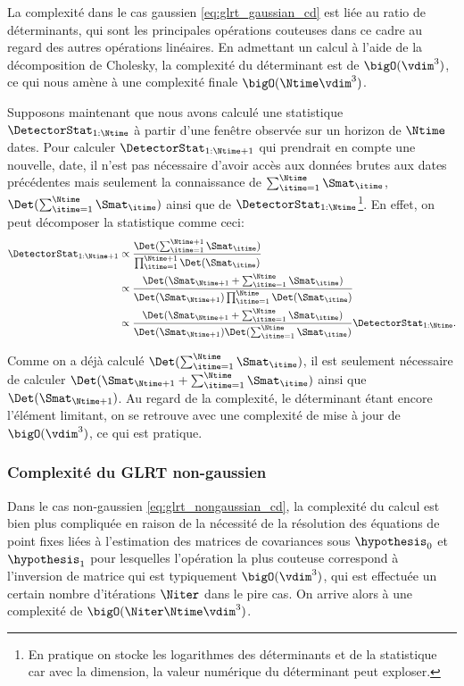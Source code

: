 La complexité dans le cas gaussien \eqref{eq:glrt_gaussian_cd} est liée au ratio de déterminants, qui sont les principales opérations couteuses dans ce cadre au regard des autres opérations linéaires. En admettant un calcul à l'aide de la décomposition de Cholesky, la complexité du déterminant est de $\bigO(\vdim^3)$, ce qui nous amène à une complexité finale $\bigO(\Ntime\vdim^3)$.

Supposons maintenant que nous avons calculé une statistique $\DetectorStat_{1:\Ntime}$ à partir d'une fenêtre observée sur un horizon de $\Ntime$ dates. Pour calculer $\DetectorStat_{1:\Ntime+1}$ qui prendrait en compte une nouvelle, date, il n'est pas nécessaire d'avoir accès aux données brutes aux dates précédentes mais seulement la connaissance de $\sum_{\itime=1}^{\Ntime}\Smat_\itime$, $\Det(\sum_{\itime=1}^{\Ntime}\Smat_\itime)$ ainsi que de $\DetectorStat_{1:\Ntime}$\footnote{En pratique on stocke les logarithmes des déterminants et de la statistique car avec la dimension, la valeur numérique du déterminant peut exploser.}. En effet, on peut décomposer la statistique comme ceci\cite{Conradsen_2016}:
$$
\begin{aligned}
  \DetectorStat_{1:\Ntime+1} &\propto \dfrac{\Det(\sum_{\itime=1}^{\Ntime+1} \Smat_\itime)}{\prod_{\itime=1}^{\Ntime+1} \Det(\Smat_\itime)} \\
  &\propto \dfrac{\Det(\Smat_{\Ntime+1} + \sum_{\itime=1}^{\Ntime} \Smat_\itime )}{ \Det(\Smat_{\Ntime+1}) \prod_{\itime=1}^{\Ntime} \Det(\Smat_\itime)} \\
  &\propto  \dfrac{\Det(\Smat_{\Ntime+1} + \sum_{\itime=1}^{\Ntime} \Smat_\itime )}{ \Det(\Smat_{\Ntime+1}) \Det(\sum_{\itime=1}^{\Ntime} \Smat_\itime)} \DetectorStat_{1:\Ntime}.
\end{aligned}
$$

Comme on a déjà calculé $\Det(\sum_{\itime=1}^{\Ntime}\Smat_\itime)$, il est seulement nécessaire de calculer $\Det(\Smat_{\Ntime+1} + \sum_{\itime=1}^{\Ntime} \Smat_\itime )$ ainsi que $\Det(\Smat_{\Ntime+1})$. Au regard de la complexité, le déterminant étant encore l'élément limitant, on se retrouve avec une complexité de mise à jour de $\bigO(\vdim^3)$, ce qui est pratique.


\subsubsection{Complexité du GLRT non-gaussien}

Dans le cas non-gaussien \eqref{eq:glrt_nongaussian_cd}, la complexité du calcul est bien plus compliquée en raison de la nécessité de la résolution des équations de point fixes liées à l'estimation des matrices de covariances sous $\hypothesis_0$ et $\hypothesis_1$ pour lesquelles l'opération la plus couteuse correspond à l'inversion de matrice qui est typiquement $\bigO(\vdim ^3)$, qui est effectuée un certain nombre d'itérations $\Niter$ dans le pire cas. On arrive alors à une complexité de $\bigO(\Niter\Ntime\vdim^3)$.


